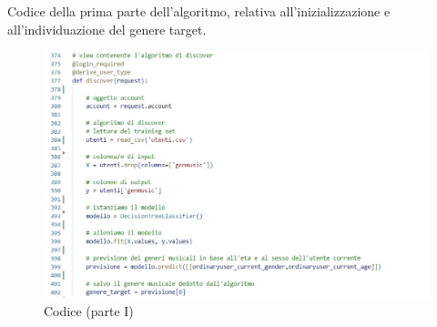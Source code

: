 Codice della prima parte dell'algoritmo, relativa all'inizializzazione 
e all'individuazione del genere target. 
\begin{figure}[H]
    \centering
    \begin{center}
    \includegraphics[scale=0.7]{images/alg1.jpg}
    \end{center}
    \caption{Codice (parte I)}
    \label{fig-codice1}
\end{figure}




